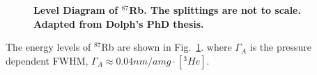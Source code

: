 \documentclass[pdftex,letterpaper,12pt]{report}
\begin{document}
\begin{figure}[t!]
	\centering
	\caption{{\bf Level Diagram of $^{87}$Rb. The splittings are not to scale. Adapted from Dolph's PhD thesis.}}
	\label{RbEnergyLevels}
\end{figure}

The energy levels of $^{87}$Rb are shown in Fig.~\ref{RbEnergyLevels}.
where $\Gamma_{A}$ is the pressure dependent FWHM, $\Gamma_{A}\approx 0.04nm/amg \cdot [^{3}He]$.


\end{document}
